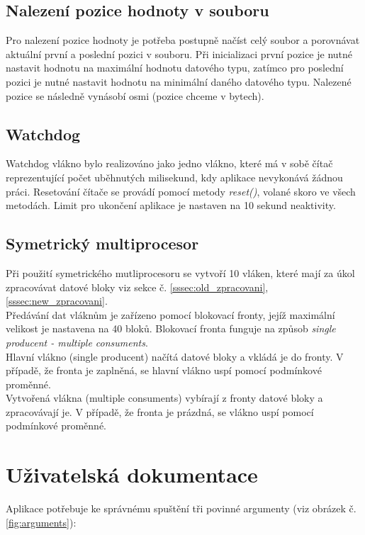 \documentclass[12pt, a4paper]{article}
\begin{document}
\subsection{Nalezení pozice hodnoty v souboru}  \label{ssec:position}
Pro nalezení pozice hodnoty je potřeba postupně načíst celý soubor a porovnávat aktuální první a poslední pozici v souboru. Při inicializaci první pozice je nutné nastavit hodnotu na maximální hodnotu datového typu, zatímco pro poslední pozici je nutné nastavit hodnotu na minimální daného datového typu. Nalezené pozice se následně vynásobí osmi (pozice chceme v bytech).

\subsection{Watchdog}
Watchdog vlákno bylo realizováno jako jedno vlákno, které má v sobě čítač reprezentující počet uběhnutých milisekund, kdy aplikace nevykonává žádnou práci. Resetování čítače se provádí pomocí metody \textit{reset()}, volané skoro ve všech metodách. Limit pro ukončení aplikace je nastaven na 10 sekund neaktivity.

\subsection{Symetrický multiprocesor}
Při použití symetrického mutliprocesoru se vytvoří 10 vláken, které mají za úkol zpracovávat datové bloky viz sekce č. \ref{sssec:old_zpracovani}, \ref{sssec:new_zpracovani}.\\
\indent Předávání dat vláknům je zařízeno pomocí blokovací fronty, jejíž maximální velikost je nastavena na 40 bloků. Blokovací fronta funguje na způsob \textit{single producent - multiple consuments}. \\
\indent Hlavní vlákno (single producent) načítá datové bloky a vkládá je do fronty. V případě, že fronta je zaplněná, se hlavní vlákno uspí pomocí podmínkové proměnné. \\
\indent Vytvořená vlákna (multiple consuments) vybírají z fronty datové bloky a zpracovávají je. V případě, že fronta je prázdná, se vlákno uspí pomocí podmínkové proměnné.









\section{Uživatelská dokumentace}
\noindent Aplikace potřebuje ke správnému spuštění tři povinné argumenty (viz obrázek č.\ref{fig:arguments}):\\
\end{document}
